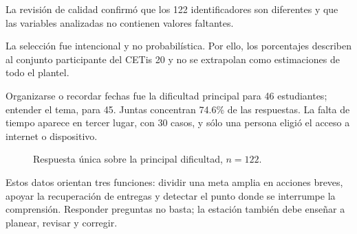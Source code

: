 \documentclass[11pt]{article}
\newcommand{\Section}[1]{\par\vspace{0.16\baselineskip}{\normalfont\normalsize\bfseries\RaggedRight #1\par}}
\begin{document}
La revisión de calidad confirmó que los 122 identificadores son diferentes y que las variables analizadas no contienen valores faltantes.

La selección fue intencional y no probabilística. Por ello, los porcentajes describen al conjunto participante del CETis 20 y no se extrapolan como estimaciones de todo el plantel.

\clearpage

\Section{Necesidades académicas}

Organizarse o recordar fechas fue la dificultad principal para 46 estudiantes; entender el tema, para 45. Juntas concentran 74.6\% de las respuestas. La falta de tiempo aparece en tercer lugar, con 30 casos, y sólo una persona eligió el acceso a internet o dispositivo.

\begin{figure}[H]
\centering
{}
\caption{Respuesta única sobre la principal dificultad, $n=122$.}
\end{figure}

Estos datos orientan tres funciones: dividir una meta amplia en acciones breves, apoyar la recuperación de entregas y detectar el punto donde se interrumpe la comprensión. Responder preguntas no basta; la estación también debe enseñar a planear, revisar y corregir.

\clearpage
\end{document}
